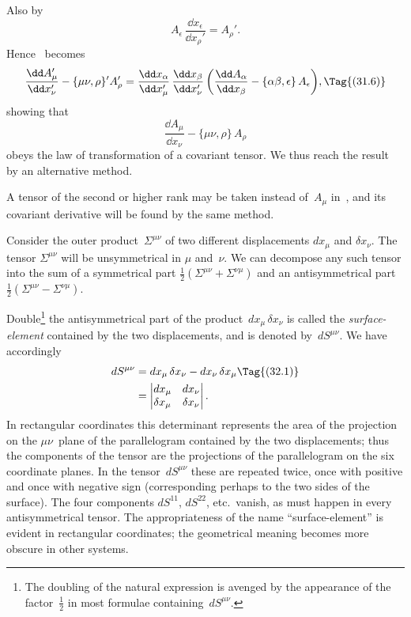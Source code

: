 \documentclass[12pt]{book}
\begin{document}
Also by~
\[
A_{\epsilon}\, \frac{\dd x_{\epsilon}}{\dd x_{\rho}'} = A_{\rho}'.
\]
Hence ~becomes
\[
\frac{\dd A_{\mu}'}{\dd x_{\nu}'} - \{\mu\nu, \rho\}' A_{\rho}'
= \frac{\dd x_{\alpha}}{\dd x_{\mu}'}\, \frac{\dd x_{\beta}}{\dd x_{\nu}'} \left(\frac{\dd A_{\alpha}}{\dd x_{\beta}} - \{\alpha\beta, \epsilon\}\, A_{\epsilon}\right)\!,
\Tag{(31.6)}
\]
showing that
\[
\frac{\dd A_{\mu}}{\dd x_{\nu}} - \{\mu\nu, \rho\}\, A_{\rho}
\]
obeys the law of transformation of a covariant tensor. We thus reach the
result~ by an alternative method.

A tensor of the second or higher rank may be taken instead of~$A_{\mu}$ in~,
and its covariant derivative will be found by the same method.


{\Loosen Consider the outer product~$\Sigma^{\mu\nu}$ of two different displacements $dx_{\mu}$ and $\delta x_{\nu}$.
The tensor $\Sigma^{\mu\nu}$ will be unsymmetrical in $\mu$ and~$\nu$. We can decompose any
such tensor into the sum of a symmetrical part $\frac{1}{2}(\Sigma^{\mu\nu} + \Sigma^{\nu\mu})$ and an antisymmetrical
part $\frac{1}{2}(\Sigma^{\mu\nu} - \Sigma^{\nu\mu})$.}

Double\footnote
  {The doubling of the natural expression is avenged by the appearance of the factor~$\frac{1}{2}$ in most
  formulae containing~$dS^{\mu\nu}$.}
the antisymmetrical part of the product~$dx_{\mu}\, \delta x_{\nu}$ is called the
\emph{surface-element} contained by the two displacements, and is denoted by~$dS^{\mu\nu}$.
%
We have accordingly
\begin{align*}
  dS^{\mu\nu} &= dx_{\mu}\, \delta x_{\nu} - dx_{\nu}\, \delta x_{\mu}
\Tag{(32.1)} \\
  &= \left\lvert\begin{array}{@{}cc@{}}
  dx_{\mu} & dx_{\nu} \\
  \delta x_{\mu} & \delta x_{\nu} \\
\end{array}\right\rvert.
\end{align*}
In rectangular coordinates this determinant represents the area of the projection
on the $\mu\nu$~plane of the parallelogram contained by the two displacements;
thus the components of the tensor are the projections of the
parallelogram on the six coordinate planes. In the tensor~$dS^{\mu\nu}$ these are
repeated twice, once with positive and once with negative sign (corresponding
perhaps to the two sides of the surface). The four components $dS^{11}$, $dS^{22}$, etc.\
vanish, as must happen in every antisymmetrical tensor. The appropriateness
\index{Antisymmetrical tensors}%
of the name ``surface-element'' is evident in rectangular coordinates; the
geometrical meaning becomes more obscure in other systems.
\end{document}
